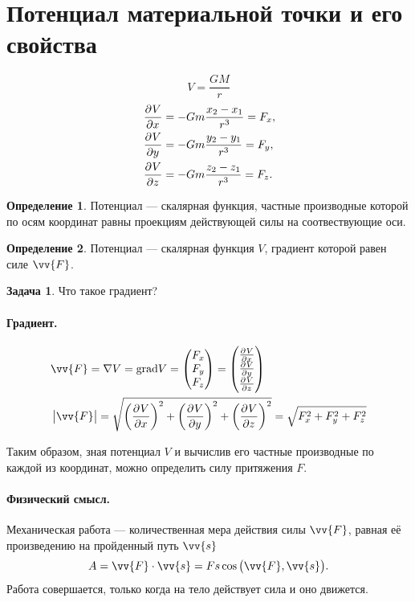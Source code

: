 \documentclass[11pt, a4paper]{article}
\theoremstyle{plain}
\theoremstyle{definition}
\newtheorem{definition}{Определение}
\newtheorem{problem}{Задача}[section]
\theoremstyle{remark}
\begin{document}
\section{Потенциал материальной точки и его свойства}
\begin{equation*}
    V = \dfrac{GM}{r}
\end{equation*}
\begin{align*}
    & \dpd{V}{x} = -Gm \dfrac{x_2 - x_1}{r^3} = F_x, \\
    & \dpd{V}{y} = -Gm \dfrac{y_2 - y_1}{r^3} = F_y,\\
    & \dpd{V}{z} = -Gm \dfrac{z_2 - z_1}{r^3} = F_z.
\end{align*}
\begin{definition}
    Потенциал --- скалярная функция, частные производные которой по осям координат равны проекциям
    действующей силы на соотвествующие оси.
\end{definition}
\begin{definition}
    Потенциал --- скалярная функция $V$, градиент которой равен силе $\vv{F}$. 
\end{definition}

\begin{problem}
	Что такое градиент?
\end{problem}

\paragraph{Градиент.} 
\begin{align*}
    &\vv{F} = \nabla V = \textrm{grad} V = \begin{pmatrix}
    F_x \\ F_y \\ F_z \end{pmatrix} = \begin{pmatrix}
        \pd{V}{x}\\\pd{V}{y}\\\pd{V}{z} 
    \end{pmatrix}\\
    &\left| \vv{F} \right| = \sqrt{\left( \dpd{V}{x} \right)^2 +\left( \dpd{V}{y} \right)^2 + \left( \dpd{V}{z} \right)^2} =
    \sqrt{F_x^2 + F_y^2 + F_z^2}
\end{align*}

Таким образом, зная потенциал $V$ и вычислив его частные производные по каждой из координат, можно
определить силу притяжения $F$. 

\paragraph{Физический смысл.}
Механическая работа --- количественная мера действия силы $\vv{F}$, равная её произведению 
на пройденный путь $\vv{s}$
\begin{equation*}
    A = \vv{F}\cdot\vv{s} = Fs\cos{\left( \vv{F}, \vv{s} \right)}.
\end{equation*}
Работа совершается, только когда на тело действует сила и оно движется.
\end{document}
